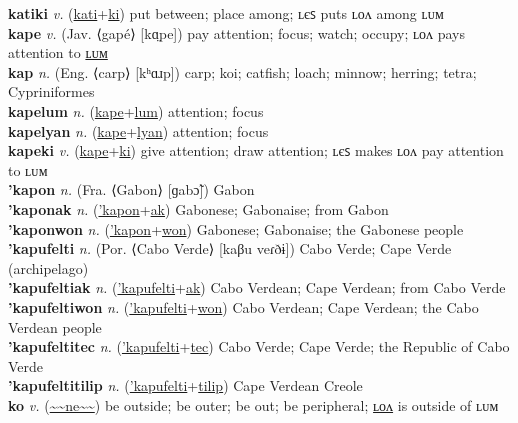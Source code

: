 \textbf{katiki} \textit{v.} (\hyperref[kati]{kati}+\hyperref[ki]{ki})
put between; place among; ʟєꜱ puts ʟᴏᴧ among ʟᴜᴍ \label{katiki} \\
\textbf{kape} \textit{v.} (Jav. ⟨gapé⟩ [kɑ̤pe])
pay attention; focus; watch; occupy; ʟᴏᴧ pays attention to \hyperref[kapelum]{ʟᴜᴍ} \label{kape} \\
\textbf{kap} \textit{n.} (Eng. ⟨carp⟩ [kʰɑɹp])
carp; koi; catfish; loach; minnow; herring; tetra; Cypriniformes \label{kap} \\
\textbf{kapelum} \textit{n.} (\hyperref[kape]{kape}+\hyperref[lum]{lum})
attention; focus \label{kapelum} \\
\textbf{kapelyan} \textit{n.} (\hyperref[kape]{kape}+\hyperref[lyan]{lyan})
attention; focus \label{kapelyan} \\
\textbf{kapeki} \textit{v.} (\hyperref[kape]{kape}+\hyperref[ki]{ki})
give attention; draw attention; ʟєꜱ makes ʟᴏᴧ pay attention to ʟᴜᴍ \label{kapeki} \\
\textbf{'kapon} \textit{n.} (Fra. ⟨Gabon⟩ [ɡabɔ̃])
Gabon \label{'kapon} \\
\textbf{'kaponak} \textit{n.} (\hyperref['kapon]{'kapon}+\hyperref[ak]{ak})
Gabonese; Gabonaise; from Gabon \label{'kaponak} \\
\textbf{'kaponwon} \textit{n.} (\hyperref['kapon]{'kapon}+\hyperref[won]{won})
Gabonese; Gabonaise; the Gabonese people \label{'kaponwon} \\
\textbf{'kapufelti} \textit{n.} (Por. ⟨Cabo Verde⟩ [kaβu veɾðɨ])
Cabo Verde; Cape Verde (archipelago) \label{'kapufelti} \\
\textbf{'kapufeltiak} \textit{n.} (\hyperref['kapufelti]{'kapufelti}+\hyperref[ak]{ak})
Cabo Verdean; Cape Verdean; from Cabo Verde \label{'kapufeltiak} \\
\textbf{'kapufeltiwon} \textit{n.} (\hyperref['kapufelti]{'kapufelti}+\hyperref[won]{won})
Cabo Verdean; Cape Verdean; the Cabo Verdean people \label{'kapufeltiwon} \\
\textbf{'kapufeltitec} \textit{n.} (\hyperref['kapufelti]{'kapufelti}+\hyperref[tec]{tec})
Cabo Verde; Cape Verde; the Republic of Cabo Verde \label{'kapufeltitec} \\
\textbf{'kapufeltitilip} \textit{n.} (\hyperref['kapufelti]{'kapufelti}+\hyperref[tilip]{tilip})
Cape Verdean Creole \label{'kapufeltitilip} \\
\textbf{ko} \textit{v.} (\hyperref[ne]{\~{}\~{}ne\~{}\~{}})
be outside; be outer; be out; be peripheral; \hyperref[kolon]{ʟᴏᴧ} is outside of ʟᴜᴍ \label{ko} \\
